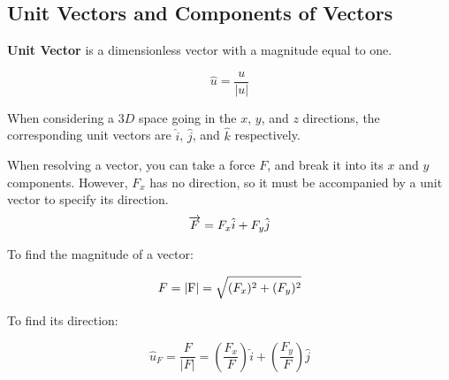 \documentclass[12pt]{article}
\begin{document}
\subsection{Unit Vectors and Components of Vectors}
\label{ssec:unitVectorsAndComponentsOfVectors}

\textbf{Unit Vector} is a dimensionless vector with a magnitude equal to one. 

\begin{equation*}
  \hat{u} = \frac{u}{|u|}
\end{equation*}

When considering a $3D$ space going in the $x$, $y$, and $z$ directions, the corresponding
unit vectors are $\hat{i}$, $\hat{j}$, and $\hat{k}$ respectively.

When resolving a vector, you can take a force $F$, and break it into its $x$ and $y$ components.
However, $F_x$ has no direction, so it must be accompanied by a unit vector to specify its direction.
\begin{equation*}
  \overrightarrow{F} = F_x\hat{i} + F_y\hat{j} \\
\end{equation*}

To find the magnitude of a vector:

\begin{equation*}
  F = |\textup{F}| = \sqrt{(F_x)^2 + (F_y)^2}
\end{equation*}

To find its direction:

\begin{equation*}
  \hat{u}_F = \frac{F}{|F|} = \left(\frac{F_x}{F}\right)\hat{i} + \left(\frac{F_y}{F}\right)\hat{j}
\end{equation*}
\end{document}

